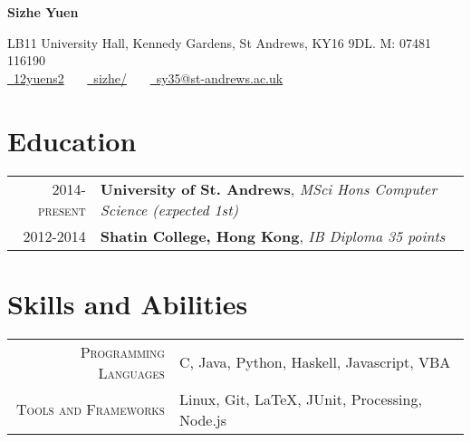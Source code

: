 \documentclass{article}
\newcommand{\n}[0]{\\[\baselineskip]}
\begin{document}
\pagestyle{empty} %


\par{\centering
		{\Large \textbf{Sizhe Yuen}
	}\par}

\begin{center}
LB11 University Hall, Kennedy Gardens, St Andrews, KY16 9DL. M: 07481 116190\\
\href{https://github.com/12yuens2}{\faGithub\ 12yuens2} \ \ \ \href{https://www.linkedin.com/in/sizhe/}{\faLinkedin\ sizhe/} \ \ \ \href{mailto:sy35@st-andrews.ac.uk}{\faEnvelopeO\ sy35@st-andrews.ac.uk}
\end{center}

\section*{Education}
\begin{tabular}{r|p{15cm}}
\textsc{2014-present} & \textbf{University of St. Andrews}, \textit{MSci Hons Computer Science (expected 1st)}
\n

\textsc{2012-2014} & \textbf{Shatin College, Hong Kong}, \textit{IB Diploma 35 points}
\end{tabular}


\section*{Skills and Abilities}
\begin{tabular}{r|p{15cm}}
\textsc{Programming Languages} & C, Java, Python, Haskell, Javascript, VBA\\

\textsc{Tools and Frameworks} & Linux, Git, \LaTeX, JUnit, Processing, Node.js
\end{tabular}
\end{document}
